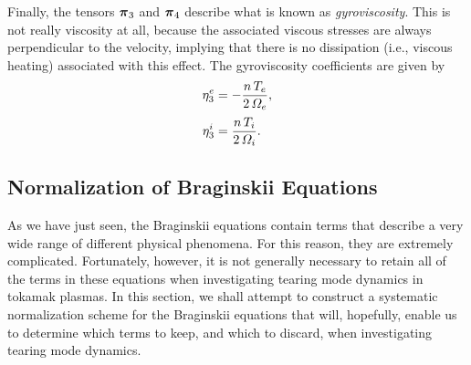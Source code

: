 \documentclass[notitlepage,12pt]{article}
\newcommand{\bpi}{\mbox{\boldmath$\pi$}}
\begin{document}
Finally, the tensors $\bpi_3$ and $\bpi_4$ describe what is known
as {\em gyroviscosity}. This is not really viscosity at all, because the
associated viscous stresses are always perpendicular to the velocity, implying that
there is no dissipation ({\rm i.e.}, viscous heating) associated with
this effect. The gyroviscosity coefficients are given by 
\begin{align}
\eta_3^e &= -\frac{n\,T_e}{2\,{\mit\Omega}_e} ,\\[0.5ex]
\eta_3^i &= \frac{n\,T_i}{2\,{\mit\Omega}_i}.
\end{align}

\subsection{Normalization of Braginskii Equations}\label{s3.9}
As we have just seen, the Braginskii equations contain terms that describe a
very wide range of different physical phenomena. For this reason, they are
extremely complicated. Fortunately, however, it is not generally 
necessary to retain all of
the terms in these equations when investigating tearing mode dynamics in tokamak plasmas. In this section, we shall attempt to construct a systematic
normalization scheme for the Braginskii equations that will, hopefully, enable us
to determine which terms to keep, and which to discard, when investigating
tearing mode dynamics. 
\end{document}
